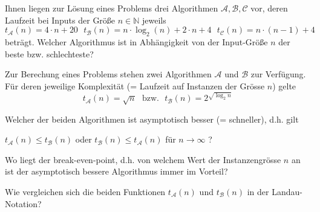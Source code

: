 
\begin{flushenum}
\item
Ihnen liegen zur Lösung eines Problems drei
Algorithmen $\mathcal{A}, \mathcal{B}, \mathcal{C}$
vor, deren Laufzeit bei Inputs der Größe $n \in \mathbb{N}$
jeweils
\[
t_{\mathcal{A}}(n) = 4 \cdot n + 20~~~
t_{\mathcal{B}}(n) = n \cdot \log_2(n) + 2 \cdot n + 4~~~
t_{\mathcal{C}}(n) = n \cdot (n-1) + 4
\]
beträgt.
Welcher Algorithmus ist in Abhängigkeit von der
Input-Größe $n$ der beste bzw. schlechteste?

\item

Zur Berechung eines Problems stehen zwei Algorithmen $\mathcal{A}$ und
$\mathcal{B}$ zur Verfügung. Für deren jeweilige Komplexität (= Laufzeit auf
Instanzen der Grösse $n$) gelte
\[
t_\mathcal{A}(n) = \sqrt{n}~~~\text{bzw.}~~~t_\mathcal{B}(n) = 2^{\sqrt{\log_2 n}}
\]
\begin{flushalpha}
\item
Welcher der beiden Algorithmen ist asymptotisch besser (= schneller), d.h. gilt

$t_\mathcal{A}(n) \leq t_\mathcal{B}(n)$ oder 
$t_\mathcal{B}(n) \leq t_\mathcal{A}(n)$ für $n \rightarrow{\infty}$ ?
\item
Wo liegt der break-even-point, d.h. von welchem Wert der Instanzengrösse $n$ an ist der
asymptotisch bessere Algorithmus immer im Vorteil?
\item
Wie vergleichen sich die beiden Funktionen $t_\mathcal{A}(n)$ und $t_\mathcal{B}(n)$
in der Landau-Notation?
\end{flushalpha}

\end{flushenum}
